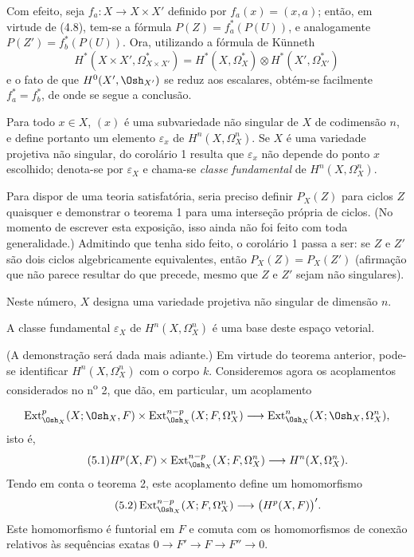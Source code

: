 Com efeito, seja $f_a:X\longrightarrow X\times X'$ definido por
$f_a(x)=(x,a)$; então, em virtude de (4.8), tem-se a fórmula
$P(Z)=f_a^{*}(P(U))$, e analogamente $P(Z')=f_b^{*}(P(U))$. Ora, utilizando a fórmula de
Künneth
\[
  H^{*}(X\times X',\Omega_{X\times X'}^{*})
  =H^{*}(X,\Omega_X^{*})\otimes H^{*}(X',\Omega_{X'}^{*})
\]
e o fato de que $H^{0}(X',\Osh_{X'})$ se reduz aos escalares, obtém-se
facilmente $f_a^{*}=f_b^{*}$, de onde se segue a conclusão.

Para todo $x\in X$, $(x)$ é uma subvariedade não singular de $X$ de
codimensão $n$, e define portanto um elemento $\varepsilon_x$ de
$H^{n}(X,\Omega_X^{n})$. Se $X$ é uma variedade projetiva não singular, do
corolário 1 resulta que $\varepsilon_x$ não depende do ponto $x$ escolhido; denota-se
por $\varepsilon_X$ e chama-se \emph{classe fundamental} de
$H^{n}(X,\Omega_X^{n})$.

 Para dispor de uma teoria satisfatória, seria preciso definir
$P_X(Z)$ para ciclos $Z$ quaisquer e demonstrar o teorema 1 para uma
interseção própria de ciclos. (No momento de escrever esta exposição, isso ainda não foi
feito com toda generalidade.) Admitindo que tenha sido feito, o corolário 1
passa a ser: se $Z$ e $Z'$ são dois ciclos algebricamente equivalentes, então
$P_X(Z)=P_X(Z')$ (afirmação que não parece resultar do que precede, mesmo que
$Z$ e $Z'$ sejam não singulares).


Neste número, $X$ designa uma variedade projetiva não singular de dimensão
$n$.

 A classe fundamental $\varepsilon_X$ de
$H^{n}(X,\Omega_X^{n})$ é uma base deste espaço vetorial.

(A demonstração será dada mais adiante.) Em virtude do teorema anterior, pode-se
identificar $H^{n}(X,\Omega_X^{n})$ com o corpo $k$. Consideremos agora os
acoplamentos considerados no n\textsuperscript{o} 2, que dão, em particular, um
acoplamento

\[
\operatorname{Ext}_{\Osh_X}^{p}(X;\Osh_X,F)
\times\operatorname{Ext}_{\Osh_X}^{n-p}(X;F,\Omega_X^{n})
\longrightarrow
\operatorname{Ext}_{\Osh_X}^{n}(X;\Osh_X,\Omega_X^{n}),
\]
isto é,
\begin{equation}\tag{5.1}
  H^{p}(X,F)
  \times\operatorname{Ext}_{\Osh_X}^{n-p}(X;F,\Omega_X^{n})
  \longrightarrow H^{n}(X,\Omega_X^{n}).
\end{equation}
Tendo em conta o teorema 2, este acoplamento define um homomorfismo
\begin{equation}\tag{5.2}
  \operatorname{Ext}_{\Osh_X}^{n-p}(X;F,\Omega_X^{n})
  \longrightarrow\bigl(H^{p}(X,F)\bigr)'.
\end{equation}
Este homomorfismo é funtorial em $F$ e comuta com os homomorfismos de conexão
relativos às sequências exatas $0\longrightarrow F'\longrightarrow F
\longrightarrow F''\longrightarrow0$.

